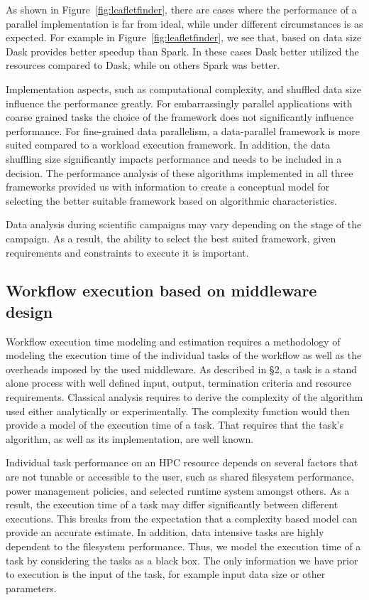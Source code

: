 As shown in Figure~\ref{fig:leafletfinder}, there are cases where the performance of a parallel implementation is far from ideal, while under different circumstances is as expected. 
For example in Figure~\ref{fig:leafletfinder}, we see that, based on data size Dask provides better speedup than Spark. 
In these cases Dask better utilized the resources compared to Dask, while on others Spark was better.

Implementation aspects, such as computational complexity, and shuffled data size influence the performance greatly. 
For embarrassingly parallel applications with coarse grained tasks the choice of the framework does not significantly influence performance. 
For fine-grained data parallelism, a data-parallel framework is more suited compared to a workload execution framework. 
In addition, the data shuffling size significantly impacts performance and needs to be included in a decision.
The performance analysis of these algorithms implemented in all three frameworks provided us with information to create a conceptual model for selecting the better suitable framework based on algorithmic characteristics.

Data analysis during scientific campaigns may vary depending on the stage of the campaign. 
As a result, the ability to select the best suited framework, given requirements and constraints to execute it is important. 

\subsection{Workflow execution based on middleware design}
\label{design_comp}
Workflow execution time modeling and estimation requires a methodology of 
modeling the execution time of the individual tasks of the workflow as well as 
the overheads imposed by the used middleware. As described in \S2, a task is a 
stand alone process with well defined input, output, termination criteria and 
resource requirements. Classical analysis requires to derive the complexity of 
the algorithm used either analytically or experimentally. The complexity 
function would then provide a model of the execution time of a task. That 
requires that the task's algorithm, as well as its implementation, are well 
known. 

Individual task performance on an HPC resource depends on several factors that 
are not tunable or accessible to the user, such as shared filesystem 
performance, power management policies, and selected runtime system amongst 
others. As a result, the execution time of a task may differ significantly 
between different executions. This breaks from the expectation that a complexity 
based model can provide an accurate estimate. In addition, data intensive tasks 
are highly dependent to the filesystem performance. Thus, we model the 
execution time of a task by considering the tasks as a black box. The only 
information we have prior to execution is the input of the task, for example 
input data size or other parameters.

